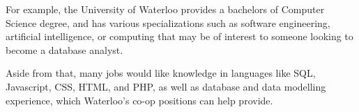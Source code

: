 \documentclass[jou]{apa7}
\begin{document}
For example, the University of Waterloo provides a bachelors of Computer Science degree,
and has various specializations such as
software engineering,
artificial intelligence,
or computing
that may be of interest to someone looking to become a database analyst.
\autocite{ComputerScience2017}

Aside from that, many jobs would like knowledge in languages like
SQL, Javascript, CSS, HTML, and PHP, as well as database and data modelling experience,
which Waterloo's co-op positions can help provide.
\autocite{jobheroDatabaseAnalystJob2020}

\printbibliography
\end{document}
